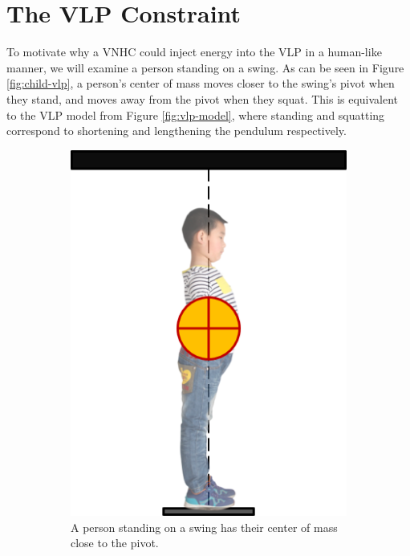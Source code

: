 \section{The VLP Constraint}
To motivate why a VNHC could inject energy into the VLP in a human-like
manner, we will examine a person standing on a swing.
As can be seen in Figure \ref{fig:child-vlp}, a person's center of mass moves closer
to the swing's pivot when they stand, and moves away from the pivot when they
squat.
This is equivalent to the VLP model from Figure \ref{fig:vlp-model}, where
standing and squatting correspond to shortening and lengthening the pendulum
respectively.
\begin{figure}
   \centering
   \begin{subfigure}[t]{0.45\textwidth}
      \includegraphics[]{images/child_vlp_standing.png}
      \caption{A person standing on a swing has their center of mass 
      close to the pivot.}
   \end{subfigure}
   \hfill
   \begin{subfigure}[t]{0.45\textwidth}

\end{subfigure}
\end{figure}
